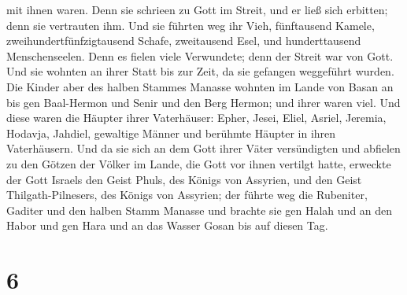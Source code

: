 mit ihnen waren. Denn sie schrieen zu Gott im Streit, und er ließ sich
erbitten; denn sie vertrauten ihm.  Und sie führten weg ihr
Vieh, fünftausend Kamele, zweihundertfünfzigtausend Schafe, zweitausend
Esel, und hunderttausend Menschenseelen.  Denn es fielen
viele Verwundete; denn der Streit war von Gott. Und sie wohnten an ihrer
Statt bis zur Zeit, da sie gefangen weggeführt wurden.  Die
Kinder aber des halben Stammes Manasse wohnten im Lande von Basan an bis
gen Baal-Hermon und Senir und den Berg Hermon; und ihrer waren viel.
 Und diese waren die Häupter ihrer Vaterhäuser: Epher,
Jesei, Eliel, Asriel, Jeremia, Hodavja, Jahdiel, gewaltige Männer und
berühmte Häupter in ihren Vaterhäusern.  Und da sie sich an
dem Gott ihrer Väter versündigten und abfielen zu den Götzen der Völker
im Lande, die Gott vor ihnen vertilgt hatte,  erweckte der
Gott Israels den Geist Phuls, des Königs von Assyrien, und den Geist
Thilgath-Pilnesers, des Königs von Assyrien; der führte weg die
Rubeniter, Gaditer und den halben Stamm Manasse und brachte sie gen
Halah und an den Habor und gen Hara und an das Wasser Gosan bis auf
diesen Tag.

\hypertarget{section-5}{%
\section{6}\label{section-5}}

